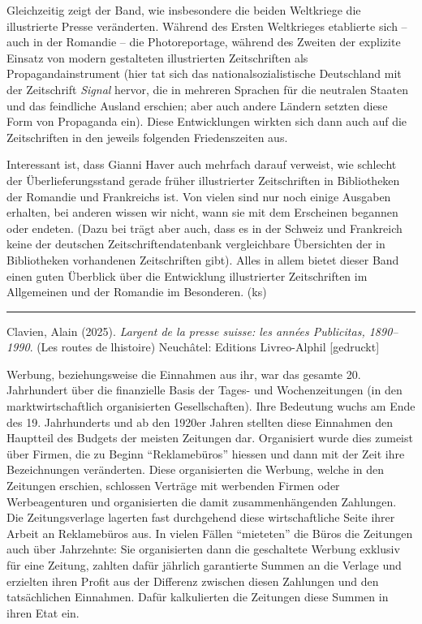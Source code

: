 \documentclass[a4paper,
fontsize=11pt,
oneside,
numbers=noperiodatend,
parskip=half-,
bibliography=totoc,
final
]{scrartcl}
\begin{document}
Gleichzeitig zeigt der Band, wie insbesondere die beiden Weltkriege die
illustrierte Presse veränderten. Während des Ersten Weltkrieges
etablierte sich -- auch in der Romandie -- die Photoreportage, während
des Zweiten der explizite Einsatz von modern gestalteten illustrierten
Zeitschriften als Propagandainstrument (hier tat sich das
nationalsozialistische Deutschland mit der Zeitschrift \emph{Signal}
hervor, die in mehreren Sprachen für die neutralen Staaten und das
feindliche Ausland erschien; aber auch andere Ländern setzten diese Form
von Propaganda ein). Diese Entwicklungen wirkten sich dann auch auf die
Zeitschriften in den jeweils folgenden Friedenszeiten aus.

Interessant ist, dass Gianni Haver auch mehrfach darauf verweist, wie
schlecht der Überlieferungsstand gerade früher illustrierter
Zeitschriften in Bibliotheken der Romandie und Frankreichs ist. Von
vielen sind nur noch einige Ausgaben erhalten, bei anderen wissen wir
nicht, wann sie mit dem Erscheinen begannen oder endeten. (Dazu bei
trägt aber auch, dass es in der Schweiz und Frankreich keine der
deutschen Zeitschriftendatenbank vergleichbare Übersichten der in
Bibliotheken vorhandenen Zeitschriften gibt). Alles in allem bietet
dieser Band einen guten Überblick über die Entwicklung illustrierter
Zeitschriften im Allgemeinen und der Romandie im Besonderen. (ks)

\begin{center}\rule{0.5\linewidth}{0.5pt}\end{center}

Clavien, Alain (2025). \emph{L\textquotesingle argent de la presse
suisse: les années Publicitas, 1890--1990}. (Les routes de
l\textquotesingle histoire) Neuchâtel: Editions Livreo-Alphil
{[}gedruckt{]}

Werbung, beziehungsweise die Einnahmen aus ihr, war das gesamte 20.
Jahrhundert über die finanzielle Basis der Tages- und Wochenzeitungen
(in den marktwirtschaftlich organisierten Gesellschaften). Ihre
Bedeutung wuchs am Ende des 19. Jahrhunderts und ab den 1920er Jahren
stellten diese Einnahmen den Hauptteil des Budgets der meisten Zeitungen
dar. Organisiert wurde dies zumeist über Firmen, die zu Beginn
\enquote{Reklamebüros} hiessen und dann mit der Zeit ihre Bezeichnungen
veränderten. Diese organisierten die Werbung, welche in den Zeitungen
erschien, schlossen Verträge mit werbenden Firmen oder Werbeagenturen
und organisierten die damit zusammenhängenden Zahlungen. Die
Zeitungsverlage lagerten fast durchgehend diese wirtschaftliche Seite
ihrer Arbeit an Reklamebüros aus. In vielen Fällen \enquote{mieteten}
die Büros die Zeitungen auch über Jahrzehnte: Sie organisierten dann die
geschaltete Werbung exklusiv für eine Zeitung, zahlten dafür jährlich
garantierte Summen an die Verlage und erzielten ihren Profit aus der
Differenz zwischen diesen Zahlungen und den tatsächlichen Einnahmen.
Dafür kalkulierten die Zeitungen diese Summen in ihren Etat ein.
\end{document}
